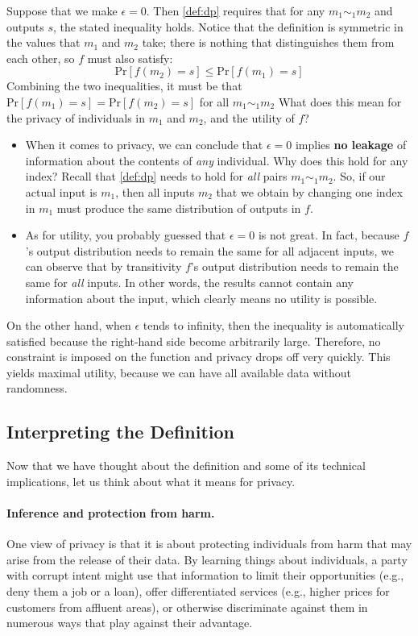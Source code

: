 \documentclass[11pt]{article}
\newcommand{\pr}{\mathrm{Pr}}
\begin{document}
Suppose that we make $\epsilon = 0$. Then \autoref{def:dp}
requires that for any $m_1 \sim_1 m_2$ and outputs $s$,
the stated inequality holds.
Notice that the definition is
symmetric in the values that $m_1$ and $m_2$ take; there is nothing that
distinguishes them from each other, so $f$ must also satisfy:
\[
  \pr[f(m_2) = s] \le \pr[f(m_1) = s]
\]
Combining the two inequalities, it must be that
$\pr[f(m_1) = s] = \pr[f(m_2) = s]$ for all $m_1 \sim_1 m_2$ What does this mean
for the privacy of individuals in $m_1$ and $m_2$, and the utility of $f$?
\begin{itemize}
\item When it comes to privacy, we can conclude that $\epsilon=0$ implies
  \textbf{no leakage} of information about the contents of \emph{any}
  individual. Why does this hold for any index? Recall that \autoref{def:dp}
  needs to hold for \emph{all} pairs $m_1 \sim_1 m_2$. So, if our actual input
  is $m_1$, then all inputs $m_2$ that we obtain by changing one index in $m_1$
  must produce the same distribution of outputs in $f$.

\item As for utility, you probably guessed that $\epsilon = 0$ is not great. In
  fact, because $f$'s output distribution needs to remain the same for all
  adjacent inputs, we can observe that by transitivity $f$'s output distribution
  needs to remain the same for \emph{all} inputs. In other words, the results
  cannot contain any information about the input, which clearly means no utility
  is possible.
\end{itemize}

On the other hand, when $\epsilon$ tends to infinity, then the inequality is
automatically satisfied because the right-hand side become arbitrarily large.
Therefore, no constraint is imposed on the function and privacy drops off
very quickly.  This yields maximal utility, because we can have all available
data without randomness.

\subsection{Interpreting the Definition}

Now that we have thought about the definition and some of its technical
implications, let us think about what it means for privacy.

\paragraph{Inference and protection from harm.}
One view of privacy is that it is about protecting individuals from harm
that may arise from the release of their data. By learning things about
individuals, a party with corrupt intent might use that information to
limit their opportunities (e.g., deny them a job or a loan), offer
differentiated services (e.g., higher prices for customers from affluent
areas), or otherwise discriminate against them in numerous ways that
play against their advantage.
\end{document}
